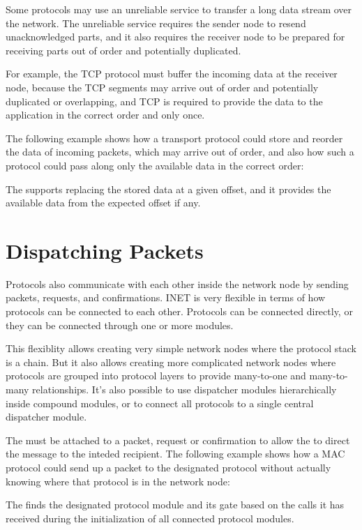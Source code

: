 Some protocols may use an unreliable service to transfer a long data stream over
the network. The unreliable service requires the sender node to resend
unacknowledged parts, and it also requires the receiver node to be prepared for
receiving parts out of order and potentially duplicated.

For example, the TCP protocol must buffer the incoming data at the receiver
node, because the TCP segments may arrive out of order and potentially
duplicated or overlapping, and TCP is required to provide the data to the
application in the correct order and only once.

The following example shows how a transport protocol could store and reorder the
data of incoming packets, which may arrive out of order, and also how such a
protocol could pass along only the available data in the correct order:


The  supports replacing the stored data at a given
offset, and it provides the available data from the expected offset if any.

\section{Dispatching Packets}

Protocols also communicate with each other inside the network node by sending
packets, requests, and confirmations. INET is very flexible in terms of how
protocols can be connected to each other. Protocols can be connected directly,
or they can be connected through one or more 
modules.

This flexiblity allows creating very simple network nodes where the protocol
stack is a chain. But it also allows creating more complicated network nodes
where protocols are grouped into protocol layers to provide many-to-one and
many-to-many relationships. It's also possible to use dispatcher modules
hierarchically inside compound modules, or to connect all protocols to a single
central dispatcher module.

The  must be attached to a packet, request or
confirmation to allow the  to direct the message to
the inteded recipient. The following example shows how a MAC protocol could send
up a packet to the designated protocol without actually knowing where that
protocol is in the network node:


The  finds the designated protocol module and its
gate based on the  calls it has received during the
initialization of all connected protocol modules.

